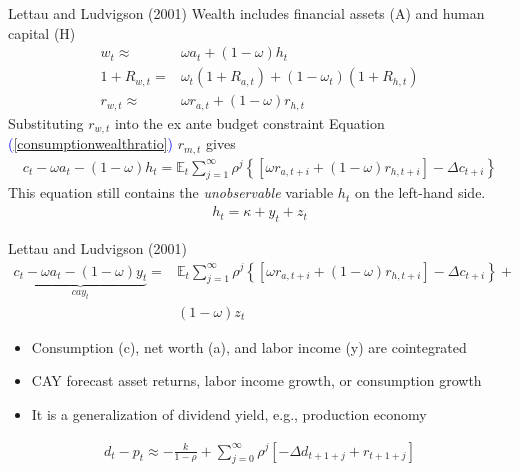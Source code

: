 \documentclass{beamer}
\begin{document}
\begin{frame}{Lettau and Ludvigson (2001)}
Wealth includes financial assets (A) and human capital (H)
\begin{align*}
	w_{t} \approx & \omega a_{t}+(1-\omega) h_{t} \\
	1+R_{w, t}=& \omega_{t}\left(1+R_{a, t}\right)+\left(1-\omega_{t}\right)\left(1+R_{h, t}\right) \\
	r_{w, t} \approx& \omega r_{a, t}+(1-\omega) r_{h, t}
\end{align*}
Substituting $ r_{w, t} $ into the ex ante budget constraint Equation \textcolor{blue}{(\ref{consumptionwealthratio})} $ r_{m, t} $ gives
\begin{align*}
	c_{t}-\omega a_{t}-(1-\omega) h_{t}=\mathbb{E}_{t} \sum_{j=1}^{\infty} \rho^{j}\left\{\left[\omega r_{a, t+i}+(1-\omega) r_{h, t+i}\right]-\Delta c_{t+i}\right\}
\end{align*}
This equation still contains the \textit{unobservable} variable $ h_t $ on the left-hand side. 
\begin{align*}
	h_{t}=\kappa+y_{t}+z_{t}
\end{align*}
\end{frame}

\begin{frame}{Lettau and Ludvigson (2001)}
	\begin{align*}
	 \underbrace{c_{t}-\omega a_{t}-(1-\omega) y_{t}}_{cay_t}	=&\mathbb{E}_{t} \sum_{j=1}^{\infty} \rho^{j}\left\{\left[\omega r_{a, t+i}+(1-\omega) r_{h, t+i}\right]-\Delta c_{t+i}\right\}+\\
		&(1-\omega) z_{t}
	\end{align*}
\begin{itemize}
	\item Consumption (c), net worth (a), and labor income (y) are cointegrated
	\item CAY forecast asset returns, labor income growth, or consumption growth
	\item It is a generalization of dividend yield, e.g., production economy
\end{itemize}
\begin{align*}
		d_t-p_t \approx  -\frac{k}{1-\rho } + \sum_{j=0}^{\infty }\rho ^{j}\left [-\Delta d_{t+1+j}+ r_{t+1+j} \right ]
\end{align*}
\end{frame}
\end{document}
